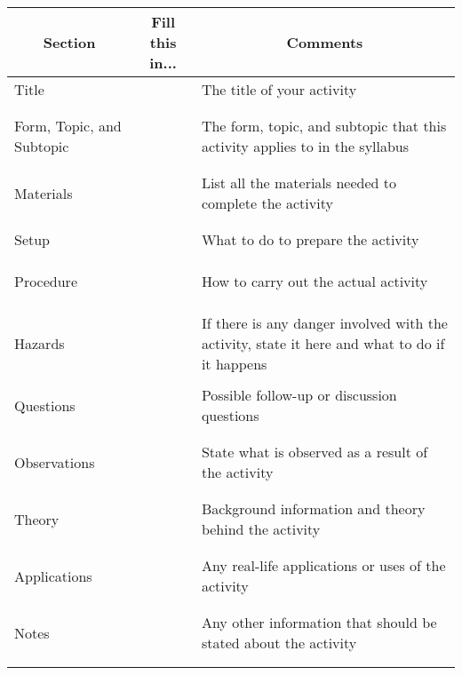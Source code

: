 \begin{center}
\begin{tabular}{|p{3cm}|p{6cm}|p{6cm}|}
\hline
\multicolumn{1}{|c|}{\textbf{Section}}&\multicolumn{1}{|c|}{\textbf{Fill this in...}}&\multicolumn{1}{|c|}{\textbf{Comments}}\\ \hline
Title&&The title of your activity\\ 
&&\\
&&\\ \hline
Form, Topic, and Subtopic&&The form, topic, and subtopic that this activity applies to in the syllabus\\
&&\\
&&\\ \hline
Materials&&List all the materials needed to complete the activity\\
&&\\
&&\\ \hline
Setup&&What to do to prepare the activity\\
&&\\
&&\\
&&\\ \hline
Procedure&&How to carry out the actual activity\\
&&\\
&&\\
&&\\ \hline
Hazards&&If there is any danger involved with the activity, state it here and what to do if it happens\\
&&\\ \hline
Questions&&Possible follow-up or discussion questions\\
&&\\
&&\\ \hline
Observations&&State what is observed as a result of the activity\\
&&\\
&&\\ \hline
Theory&&Background information and theory behind the activity\\
&&\\
&&\\ \hline
Applications&&Any real-life applications or uses of the activity\\
&&\\
&&\\ \hline
Notes&&Any other information that should be stated about the activity\\
&&\\
&&\\ \hline
\end{tabular}
\end{center}